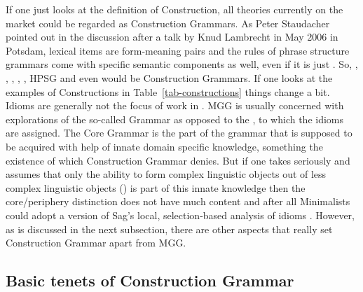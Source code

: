 \documentclass[output=paper]{langsci/langscibook}
\begin{document}
If one just looks at the definition of Construction, all theories currently on the market could be
regarded as Construction Grammars. As Peter Staudacher pointed out in the discussion after a talk by
Knud Lambrecht in May 2006 in Potsdam, lexical items are form-meaning pairs and the rules of
phrase structure grammars come with specific semantic components as well, even if it is just
. So, \cg, , \gpsg, \treeag,
\lfg, HPSG and even \minimalism would be Construction Grammars. If one looks at the
examples of Constructions in Table~\ref{tab-constructions} things change a bit. Idioms are generally
not the focus of work in . MGG is usually concerned with
explorations of the so-called  Grammar as opposed to the , to which the
idioms are assigned. The Core Grammar is the part of the grammar that is supposed to be acquired with
help of innate domain specific knowledge, something the existence of which Construction Grammar
denies. But if one takes \citet*{HCF2002a} seriously and assumes that only the ability to form complex
linguistic objects out of less complex linguistic objects () is part of this innate knowledge
then the core/periphery distinction does not have much content and after all Minimalists could adopt
a version of Sag's local, selection-based analysis of idioms \parencites{Sag2007a}{KSF2015a}{KM2017a}.
However, as is discussed in the next subsection, there are other aspects that really set Construction Grammar apart from
MGG.

\subsection{Basic tenets of Construction Grammar}
\label{sec-tenets}
\end{document}
